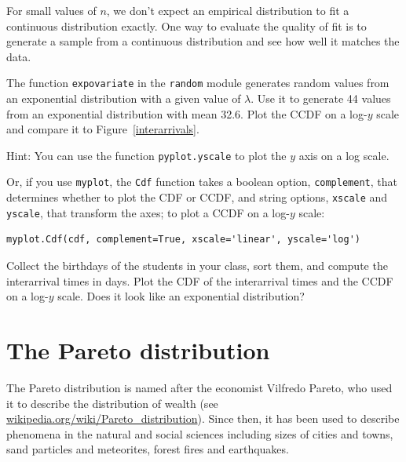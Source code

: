 \documentclass[12pt]{book}
\begin{document}
\begin{exercise}
For small values of $n$, we don't expect an empirical distribution
to fit a continuous distribution exactly.  One way to evaluate
the quality of fit is to generate a sample from a continuous
distribution and see how well it matches the data.


The function {\tt expovariate} in the {\tt random} module generates
random values from an exponential distribution with a given value of
$\lambda$.  Use it to generate 44 values from an exponential
distribution with mean 32.6.  Plot the CCDF on a log-$y$ scale and
compare it to Figure~\ref{interarrivals}.


Hint: You can use the function {\tt pyplot.yscale} to plot the $y$ axis
on a log scale.

Or, if you use {\tt myplot}, the {\tt Cdf} function takes a boolean
option, {\tt complement}, that determines whether to plot the CDF or
CCDF, and string options, {\tt xscale} and {\tt yscale}, that
transform the axes; to plot a CCDF on a log-$y$ scale:

\begin{verbatim}
myplot.Cdf(cdf, complement=True, xscale='linear', yscale='log') 
\end{verbatim}

\end{exercise}

\begin{exercise}
Collect the birthdays of the students in your class, sort them, and
compute the interarrival times in days.  Plot the CDF of the interarrival
times and the CCDF on a log-$y$ scale.  Does it look like
an exponential distribution?


\end{exercise}


\section{The Pareto distribution}

The Pareto distribution is named after the economist Vilfredo Pareto,
who used it to describe the distribution of wealth (see
\url{wikipedia.org/wiki/Pareto_distribution}).  Since then, it has
been used to describe phenomena in the natural and social
sciences including sizes of cities and towns, sand particles and
meteorites, forest fires and earthquakes.
\end{document}
